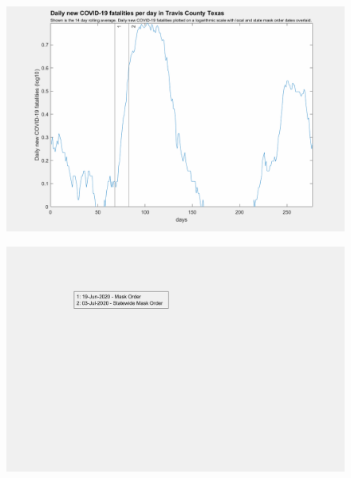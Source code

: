 \documentclass[]{article}
\begin{document}
\begin{figure}[!h]
	\includegraphics[width=\linewidth]{images/travis_mask_order_fatalities_log.png}
	\caption{}
	\label{fig:images/travis_mask_order_fatalities_logLabel}
\end{figure}

\begin{figure}[!h]
	\includegraphics[width=\linewidth]{legends/dallas_mask_order_legend.png}
	\caption{}
	\label{fig:legends/dallas_mask_order_legendLabel}
\end{figure}
\end{document}

